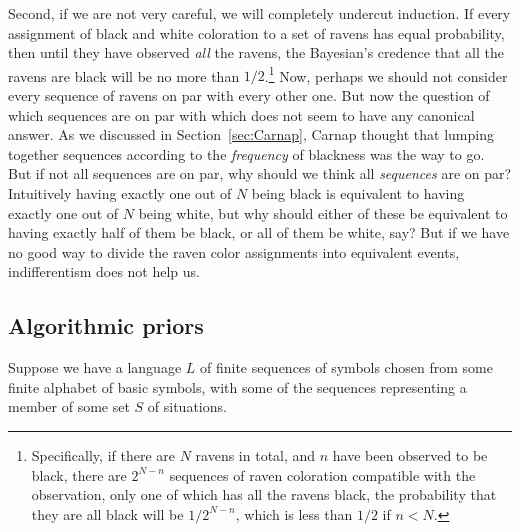 Second, if we are not very careful, we will completely undercut induction.
If every assignment of black and white coloration to a set of ravens has equal probability, then until
they have observed \textit{all} the ravens, the Bayesian's credence that all the ravens are black will
be no more than $1/2$.\footnote{Specifically, if there are $N$ ravens in total, and $n$ have been observed 
to be black, there are $2^{N-n}$ sequences of raven coloration compatible with the observation, only
one of which has all the ravens black, the probability that they are all black will be $1/2^{N-n}$, which
is less than $1/2$ if $n<N$.} Now, perhaps we should not consider every sequence of ravens on par with 
every other one. But now the question of which sequences are on par with which does not seem to have any
canonical answer. As we discussed in Section~\ref{sec:Carnap}, Carnap thought that lumping together sequences 
according to the \textit{frequency} of blackness was the way to go. But if not all sequences are on par,
why should we think all \textit{sequences} are on par? Intuitively having exactly one out of $N$ being black 
is equivalent to having exactly one out of $N$ being white, but why should either of these be equivalent 
to having exactly half of them be black, or all of them be white, say? But if we have no good way to 
divide the raven color assignments into equivalent events, indifferentism does not help us.

\subsection{Algorithmic priors}
Suppose we have a language $L$ of finite sequences of symbols chosen from some finite alphabet of basic symbols, 
with some of the sequences representing a member of some set $S$ of situations. 

